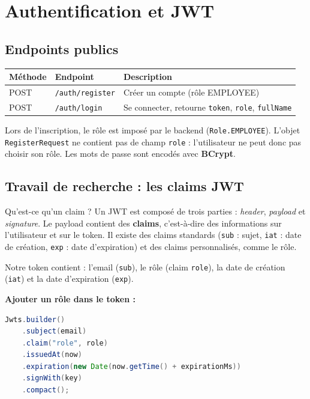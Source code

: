 \documentclass{rapportENSET}
\begin{document}
\section{Authentification et JWT}

\subsection{Endpoints publics}

\begin{center}
\begin{tabular}{lll}
\toprule
\textbf{M\'ethode} & \textbf{Endpoint} & \textbf{Description} \\
\midrule
POST & \texttt{/auth/register} & Cr\'eer un compte (r\^ole EMPLOYEE) \\
POST & \texttt{/auth/login} & Se connecter, retourne \texttt{token}, \texttt{role}, \texttt{fullName} \\
\bottomrule
\end{tabular}
\end{center}

Lors de l'inscription, le r\^ole est impos\'e par le backend (\texttt{Role.EMPLOYEE}). L'objet \texttt{RegisterRequest} ne contient pas de champ \texttt{role} : l'utilisateur ne peut donc pas choisir son r\^ole. Les mots de passe sont encod\'es avec \textbf{BCrypt}.

\subsection{Travail de recherche : les claims JWT}

\begin{definitionbox}{Qu'est-ce qu'un claim ?}
Un JWT est compos\'e de trois parties : \emph{header}, \emph{payload} et \emph{signature}. Le payload contient des \textbf{claims}, c'est-\`a-dire des informations sur l'utilisateur et sur le token. Il existe des claims standards (\texttt{sub} : sujet, \texttt{iat} : date de cr\'eation, \texttt{exp} : date d'expiration) et des claims personnalis\'es, comme le r\^ole.
\end{definitionbox}

Notre token contient : l'email (\texttt{sub}), le r\^ole (claim \texttt{role}), la date de cr\'eation (\texttt{iat}) et la date d'expiration (\texttt{exp}).

\textbf{Ajouter un r\^ole dans le token :}

\begin{lstlisting}[language=Java]
Jwts.builder()
    .subject(email)
    .claim("role", role)
    .issuedAt(now)
    .expiration(new Date(now.getTime() + expirationMs))
    .signWith(key)
    .compact();
\end{lstlisting}
\end{document}
